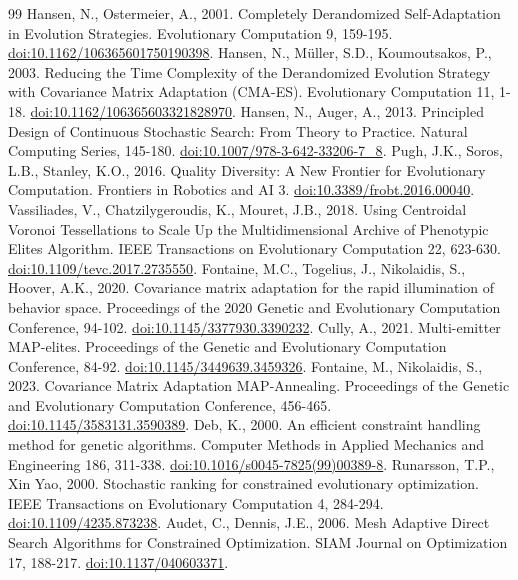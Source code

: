\begin{thebibliography}{99}
 Hansen, N., Ostermeier, A., 2001. Completely Derandomized Self-Adaptation in Evolution Strategies. Evolutionary Computation 9, 159-195. \href{https://doi.org/10.1162/106365601750190398}{doi:10.1162/106365601750190398}.
 Hansen, N., Müller, S.D., Koumoutsakos, P., 2003. Reducing the Time Complexity of the Derandomized Evolution Strategy with Covariance Matrix Adaptation (CMA-ES). Evolutionary Computation 11, 1-18. \href{https://doi.org/10.1162/106365603321828970}{doi:10.1162/106365603321828970}.
 Hansen, N., Auger, A., 2013. Principled Design of Continuous Stochastic Search: From Theory to Practice. Natural Computing Series, 145-180. \href{https://doi.org/10.1007/978-3-642-33206-7_8}{doi:10.1007/978-3-642-33206-7\_8}.
 Pugh, J.K., Soros, L.B., Stanley, K.O., 2016. Quality Diversity: A New Frontier for Evolutionary Computation. Frontiers in Robotics and AI 3. \href{https://doi.org/10.3389/frobt.2016.00040}{doi:10.3389/frobt.2016.00040}.
 Vassiliades, V., Chatzilygeroudis, K., Mouret, J.B., 2018. Using Centroidal Voronoi Tessellations to Scale Up the Multidimensional Archive of Phenotypic Elites Algorithm. IEEE Transactions on Evolutionary Computation 22, 623-630. \href{https://doi.org/10.1109/tevc.2017.2735550}{doi:10.1109/tevc.2017.2735550}.
 Fontaine, M.C., Togelius, J., Nikolaidis, S., Hoover, A.K., 2020. Covariance matrix adaptation for the rapid illumination of behavior space. Proceedings of the 2020 Genetic and Evolutionary Computation Conference, 94-102. \href{https://doi.org/10.1145/3377930.3390232}{doi:10.1145/3377930.3390232}.
 Cully, A., 2021. Multi-emitter MAP-elites. Proceedings of the Genetic and Evolutionary Computation Conference, 84-92. \href{https://doi.org/10.1145/3449639.3459326}{doi:10.1145/3449639.3459326}.
 Fontaine, M., Nikolaidis, S., 2023. Covariance Matrix Adaptation MAP-Annealing. Proceedings of the Genetic and Evolutionary Computation Conference, 456-465. \href{https://doi.org/10.1145/3583131.3590389}{doi:10.1145/3583131.3590389}.
 Deb, K., 2000. An efficient constraint handling method for genetic algorithms. Computer Methods in Applied Mechanics and Engineering 186, 311-338. \href{https://doi.org/10.1016/s0045-7825(99)00389-8}{doi:10.1016/s0045-7825(99)00389-8}.
 Runarsson, T.P., Xin Yao, 2000. Stochastic ranking for constrained evolutionary optimization. IEEE Transactions on Evolutionary Computation 4, 284-294. \href{https://doi.org/10.1109/4235.873238}{doi:10.1109/4235.873238}.
 Audet, C., Dennis, J.E., 2006. Mesh Adaptive Direct Search Algorithms for Constrained Optimization. SIAM Journal on Optimization 17, 188-217. \href{https://doi.org/10.1137/040603371}{doi:10.1137/040603371}.

\end{thebibliography}
